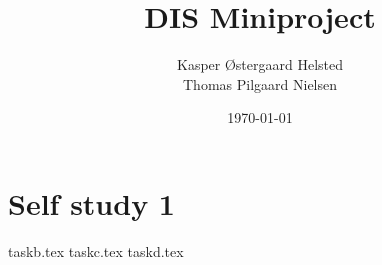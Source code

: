 \documentclass[twoside]{report}
\begin{document}
\pagestyle{empty} %
%
%

\title{DIS Miniproject}
\date{\today}
\author{Kasper Østergaard Helsted \\ Thomas Pilgaard Nielsen}

\maketitle

%
%


\chapter{Self study 1}
{taskb.tex}
{taskc.tex}
{taskd.tex}

\end{document}
